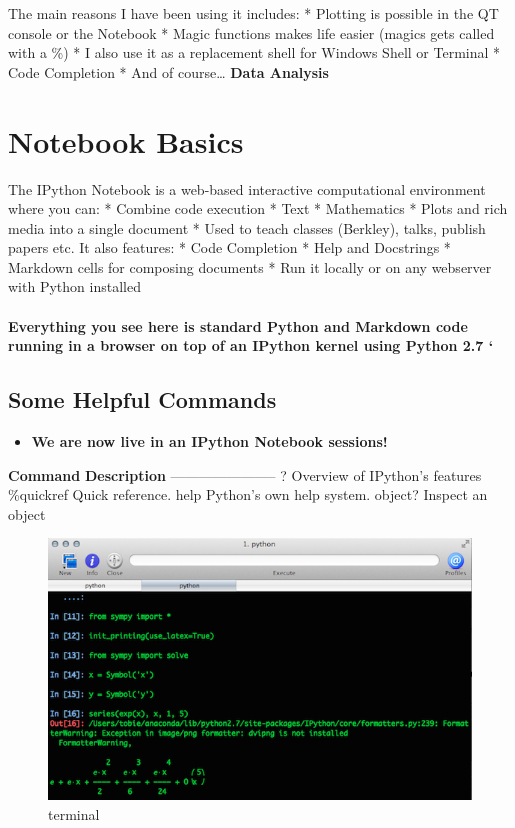 \documentclass{article}
\begin{document}
The main reasons I have been using it includes: * Plotting is possible
in the QT console or the Notebook * Magic functions makes life easier
(magics gets called with a \%) * I also use it as a replacement shell
for Windows Shell or Terminal * Code Completion * And of course\ldots{}
\textbf{Data Analysis}

    \section{Notebook Basics}

The IPython Notebook is a web-based interactive computational
environment where you can: * Combine code execution * Text * Mathematics
* Plots and rich media into a single document * Used to teach classes
(Berkley), talks, publish papers etc. It also features: * Code
Completion * Help and Docstrings * Markdown cells for composing
documents * Run it locally or on any webserver with Python installed

\paragraph{Everything you see here is standard Python and Markdown code
running in a browser on top of an IPython kernel using Python 2.7 `}

    \subsection{Some Helpful Commands}

\begin{itemize}
\itemsep1pt\parskip0pt
\item
  \textbf{We are now live in an IPython Notebook sessions!}
\end{itemize}

\textbf{Command} \textbar{} \textbf{Description} \textbar{}
------------\textbar{}----------- \textbar{} \textbar{} ? \textbar{}
Overview of IPython's features \%quickref \textbar{} Quick reference.
help \textbar{} Python's own help system. object? \textbar{} Inspect an
object

\begin{figure}[htbp]
\centering
\includegraphics{static/img/terminal.png}
\caption{terminal}
\end{figure}
\end{document}
